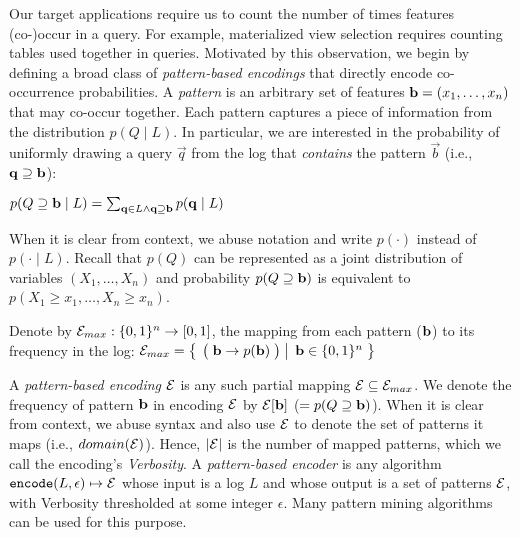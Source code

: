 
Our target applications require us to count the number of times features (co-)occur in a query.  
For example, materialized view selection requires counting tables used together in queries.
Motivated by this observation, we begin by defining a broad class of \emph{pattern-based encodings} that directly encode co-occurrence probabilities.
A \emph{pattern} is an arbitrary set of features $\mathbf{b}=(x_1,\ldots,x_n)$ that may co-occur together.
Each pattern captures a piece of information from the distribution $p(Q\;|\;L)$.
In particular, we are interested in the probability of uniformly drawing a query $\vec{q}$ from the log that \textit{contains} the pattern $\vec b$ (i.e., $\mathbf{q}\supseteq\mathbf{b}$): \vspace*{-1mm}
\begin{center}
{\small $p(Q\supseteq\mathbf{b}\;|\;L)=\sum_{\mathbf{q}\in L\land \mathbf{q}\supseteq \mathbf{b}}p(\mathbf{q}\;|\;L)$}
\end{center}\vspace*{-1mm}
\noindent When it is clear from context, we abuse notation and write $p(\cdot)$ instead of $p(\cdot\;|\;L)$.
%
Recall that $p(Q)$ can be represented as a joint distribution of variables $(X_1,\ldots,X_n)$ and probability $p(Q\supseteq\mathbf{b})$ is equivalent to $p(X_1\geq x_1,\ldots,X_n\geq x_n)$.

Denote by $\mathcal E_{max} : \{0,1\}^n \rightarrow [0,1]$, the mapping from each pattern ($\mathbf{b}$) to its frequency in the log: 
 $\mathcal E_{max} = \left\{\left.\;{\big(\;\mathbf{b} \rightarrow p(\mathbf{b})\;\big)}\;\right|\;{\mathbf{b} \in \{0,1\}^n}\;\right\}$

A \emph{pattern-based encoding} $\mathcal E$ is any such partial mapping $\mathcal E \subseteq \mathcal E_{max}$. 
We denote the frequency of pattern $\mathbf{b}$ in encoding $\mathcal E$ by $\mathcal E[\mathbf{b}] $ ($= p(Q\supseteq\mathbf{b})$).
When it is clear from context, we abuse syntax and also use $\mathcal E$ to denote the set of patterns it maps (i.e., $domain(\mathcal E)$).
Hence, $|\mathcal E|$ is the number of mapped patterns, which we call the encoding's \emph{Verbosity}.
A \emph{pattern-based encoder} is any algorithm $\texttt{encode}(L, \epsilon) \mapsto \mathcal E$ whose input is a log $L$ and whose output is a set of patterns $\mathcal E$, with Verbosity thresholded at some integer $\epsilon$.
Many pattern mining algorithms~\cite{DBLP:journals/tkdd/MampaeyVT12,DBLP:journals/pvldb/GebalyAGKS14} can be used for this purpose.

